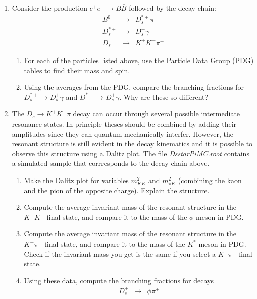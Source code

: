 \documentclass[12pt]{article}
\begin{document}
\begin{enumerate}
\item Consider the production $e^+e^- \rightarrow  B\overline B$ followed by the
decay chain:
\begin{eqnarray*}
B^0 & \rightarrow & D_s^{*+}\pi^-\\
D_s^{*+} & \rightarrow & D_s^+ \gamma\\
D_s  & \rightarrow & K^+K^- \pi^+
\end{eqnarray*}
\begin{enumerate}
\item For each of the particles listed above, use the Particle Data Group (PDG) tables to find their mass and spin. 
\item Using the averages from the PDG, compare the branching fractions for  $D_s^{*+}\rightarrow D_s^+ \gamma$
and $D^{*+}\rightarrow D_s^+ \gamma$.  Why are these so different?
\end{enumerate}
\item The $D_s\rightarrow K^+K^-\pi$ decay can occur through several possible intermediate resonance states.
In principle theses should be combined by adding their amplitudes since they can quantum mechanically
interfer.  However, the resonant structure is still evident in the decay kinematics and it is possible
to observe this structure using a Dalitz plot. The file  {\it DsstarPiMC.root} contains a simulated
sample that corrresponds to the decay chain above.
\begin{enumerate}
\item Make the Dalitz plot for variables $m_{KK}^2$ and $m_{\pi K}^2$
(combining the kaon and the pion of the opposite charge). Explain the structure.
\item Compute the average invariant mass of the resonant structure in the $K^+K^-$ final state,
and compare it to the mass of the $\phi$ meson in PDG. 
\item Compute the average invariant mass of the resonant structure in the $K^-\pi^+$ final state,
and compare it to the mass of the $K^*$ meson in PDG.  Check if the invariant mass you get is the same if you select a $K^+\pi^-$ final state.
\item Using these data, compute the branching fractions for decays
\begin{eqnarray*}
D_s^+ &\rightarrow &  \phi \pi^+\\ 

\end{eqnarray*}
\end{enumerate}
\end{enumerate}
\end{document}
